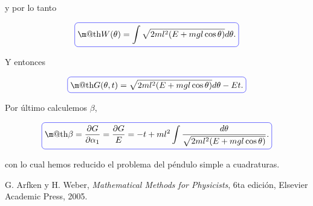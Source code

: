 \documentclass[a4paper,10pt]{article}
\makeatletter
\numberwithin{equation}{section}
\newcommand*{\boxcolor}{blue}
\renewcommand{\boxed}[1]{\textcolor{\boxcolor}{%
\tikz[baseline={([yshift=-1ex]current bounding box.center)}] \node [rectangle, minimum width=1ex,rounded corners,draw] {\normalcolor\m@th$\displaystyle#1$};}}
\makeatother
\begin{document}
y por lo tanto 

\begin{equation}
 \boxed{W(\theta) = \int \sqrt{2ml^2(E + mgl\cos{\theta})} d\theta.}
\end{equation}

Y entonces 

\begin{equation}
 \boxed{G(\theta,t) = \sqrt{2ml^2(E + mgl\cos{\theta})} d\theta - Et.}
\end{equation}

Por último calculemos $\beta$, 

\begin{equation}
 \boxed{\beta = \frac{\partial G}{\partial \alpha_1} = \frac{\partial G}{E} = 
 - t + ml^2 \int \frac{d\theta}{\sqrt{2ml^2(E + mgl\cos{\theta})}}.}
\end{equation}

\vspace{.2cm}

con lo cual hemos reducido el problema del péndulo simple a cuadraturas.

\begin{thebibliography}{10}
G. Arfken y H. Weber, \emph{Mathematical Methods for Physicists}, 6ta edición, Elsevier 
Academic Press, 2005.
\end{thebibliography}
\end{document}
